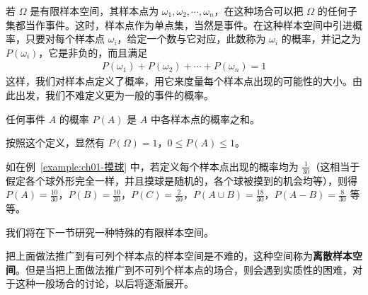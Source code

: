 \documentclass[../../main.tex]{subfiles}
\begin{document}
若 $\Omega$ 是有限样本空间，其样本点为 $\omega_1,\omega_2,\cdots,\omega_n$，在这种场合可以把 $\Omega$ 的任何子集都当作事件。这时，样本点作为单点集，当然是事件。在这种样本空间中引进概率，只要对每个样本点 $\omega_i$，给定一个数与它对应，此数称为 $\omega_i$ 的概率，并记之为 $P(\omega_i)$，它是非负的，而且满足
\begin{align}
P(\omega_1)+P(\omega_2)+\cdots+P(\omega_n)=1\label{align:ch01-有限样本空间概率和}
\end{align}
这样，我们对样本点定义了概率，用它来度量每个样本点出现的可能性的大小。由此出发，我们不难定义更为一般的事件的概率。

\begin{definition}[事件的概率]\label{definition:ch01-事件概率}
任何事件 $A$ 的概率 $P(A)$ 是 $A$ 中各样本点的概率之和。
\end{definition}

按照这个定义，显然有 $P(\Omega)=1$，$0\leqslant P(A)\leqslant 1$。

如在例~\ref{example:ch01-摸球} 中，若定义每个样本点出现的概率均为 $\frac{1}{30}$（这相当于假定各个球外形完全一样，并且摸球是随机的，各个球被摸到的机会均等），则得 $P(A)=\frac{10}{30}$，$P(B)=\frac{10}{30}$，$P(C)=\frac{2}{30}$，$P(A\cup B)=\frac{18}{30}$，$P(A-B)=\frac{8}{30}$ 等等。

我们将在下一节研究一种特殊的有限样本空间。

把上面做法推广到有可列个样本点的样本空间是不难的，这种空间称为\textbf{离散样本空间}。但是当把上面做法推广到不可列个样本点的场合，则会遇到实质性的困难，对于这种一般场合的讨论，以后将逐渐展开。
\end{document}
